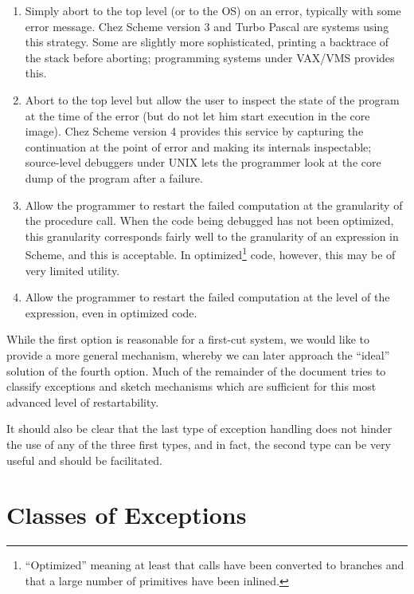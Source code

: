 \begin{enumerate}

\item 
Simply abort to the top level (or to the OS) on an error, typically with
some error message. Chez Scheme version 3 and Turbo Pascal are systems
using this strategy. Some are slightly more sophisticated, printing a
backtrace of the stack before aborting; programming systems under VAX/VMS
provides this.

\item
Abort to the top level but allow the user to inspect the state of the
program at the time of the error (but do not let him start execution
in the core image). Chez Scheme version 4 provides this service by
capturing the continuation at the point of error and making its internals
inspectable; source-level debuggers under UNIX lets the programmer look
at the core dump of the program after a failure.

\item
Allow the programmer to restart the failed computation at the
granularity of the procedure call. When the code being debugged has
not been optimized, this granularity corresponds fairly well to the
granularity of an expression in Scheme, and this is acceptable. In
optimized\footnote{``Optimized'' meaning at least that calls have been
converted to branches and that a large number of primitives have been
inlined.} code, however, this may be of very limited utility.

\item
Allow the programmer to restart the failed computation at the level
of the expression, even in optimized code.

\end{enumerate}

While the first option is reasonable for a first-cut system, we would
like to provide a more general mechanism, whereby we can later
approach the ``ideal'' solution of the fourth option. Much of the
remainder of the document tries to classify exceptions and sketch
mechanisms which are sufficient for this most advanced level of
restartability.

It should also be clear that the last type of exception handling does not
hinder the use of any of the three first types, and in fact, the second
type can be very useful and should be facilitated.

\section{Classes of Exceptions}

